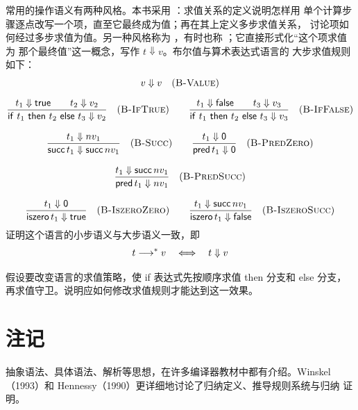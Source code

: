 \begin{exercise}
\label{ex:3.5.17}
常用的操作语义有两种风格。本书采用
：求值关系的定义说明怎样用
单个计算步骤逐点改写一个项，直至它最终成为值；再在其上定义多步求值关系，
讨论项如何经过多步求值为值。另一种风格称为
，有时也称
；它直接形式化“这个项求值为
那个最终值”这一概念，写作 \(t\Downarrow v\)。布尔值与算术表达式语言的
大步求值规则如下：
\[
\begin{gathered}
 v\Downarrow v\quad(\textsc{B-Value})
 \\[6pt]
 \frac{t_1\Downarrow\mathsf{true}\qquad t_2\Downarrow v_2}
      {\mathsf{if}\ t_1\ \mathsf{then}\ t_2\ \mathsf{else}\ t_3\Downarrow v_2}
 \quad(\textsc{B-IfTrue})
 \qquad
 \frac{t_1\Downarrow\mathsf{false}\qquad t_3\Downarrow v_3}
      {\mathsf{if}\ t_1\ \mathsf{then}\ t_2\ \mathsf{else}\ t_3\Downarrow v_3}
 \quad(\textsc{B-IfFalse})
 \\[8pt]
 \frac{t_1\Downarrow nv_1}{\mathsf{succ}\,t_1\Downarrow\mathsf{succ}\,nv_1}
 \quad(\textsc{B-Succ})
 \qquad
 \frac{t_1\Downarrow\mathsf{0}}{\mathsf{pred}\,t_1\Downarrow\mathsf{0}}
 \quad(\textsc{B-PredZero})
 \\[8pt]
 \frac{t_1\Downarrow\mathsf{succ}\,nv_1}{\mathsf{pred}\,t_1\Downarrow nv_1}
 \quad(\textsc{B-PredSucc})
 \\[8pt]
 \frac{t_1\Downarrow\mathsf{0}}{\mathsf{iszero}\,t_1\Downarrow\mathsf{true}}
 \quad(\textsc{B-IszeroZero})
 \qquad
 \frac{t_1\Downarrow\mathsf{succ}\,nv_1}
      {\mathsf{iszero}\,t_1\Downarrow\mathsf{false}}
 \quad(\textsc{B-IszeroSucc})
\end{gathered}
\]
证明这个语言的小步语义与大步语义一致，即
\[
 t\mathrel{\longrightarrow^{*}} v\quad\Longleftrightarrow\quad t\Downarrow v
\]
\end{exercise}

\begin{exercise}[\(\star\star,\nrightarrow\)]
\label{ex:3.5.18}
假设要改变语言的求值策略，使 if 表达式先按顺序求值 then 分支和 else
分支，再求值守卫。说明应如何修改求值规则才能达到这一效果。
\end{exercise}

\section{注记}
\label{sec:3.6}

抽象语法、具体语法、解析等思想，在许多编译器教材中都有介绍。Winskel
（1993）和 Hennessy（1990）更详细地讨论了归纳定义、推导规则系统与归纳
证明。

